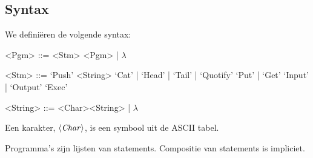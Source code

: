 \subsection{Syntax}
\label{sec:def:syn}
We definiëren de volgende syntax:
\setlength{\grammarindent}{5em}
\begin{grammar}
	<Pgm> ::= <Stm> <Pgm> | $\lambda$

	<Stm> ::= `Push' <String>
		\alt `Cat' | `Head' | `Tail' | `Quotify'
		\alt `Put' | `Get'
		\alt `Input' | `Output'
		\alt `Exec'

	<String> ::= <Char><String> | $\lambda$
\end{grammar}

Een karakter, $\langle\mathit{Char}\rangle$, is een symbool uit de ASCII tabel. 

Programma's zijn lijsten van statements. Compositie van statements is
impliciet.

